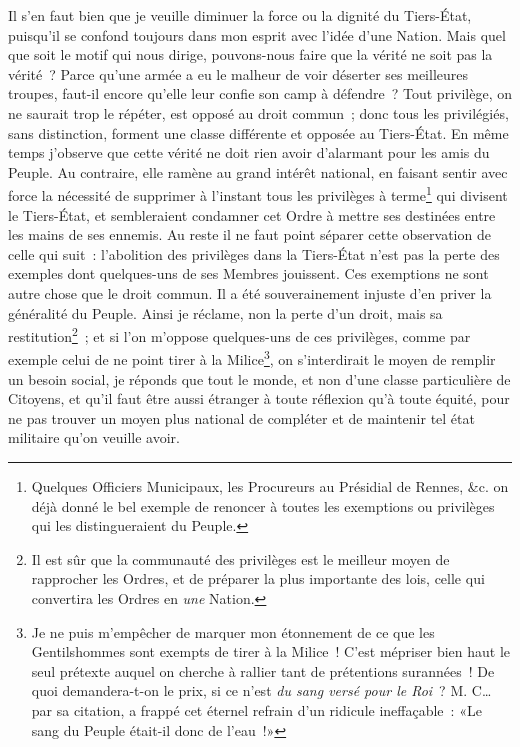 \documentclass[french,twoside]{book} %
\begin{document}
Il s’en faut bien que je veuille diminuer la force ou la dignité du Tiers-État, puisqu’il se confond toujours dans mon esprit avec l’idée d’une Nation. Mais quel que soit le motif qui nous dirige, pouvons-nous faire que la vérité ne soit pas la vérité ? Parce qu’une armée a eu le malheur de voir déserter ses meilleures troupes, faut-il encore qu’elle leur confie son camp à défendre ? Tout privilège, on ne saurait trop le répéter, est opposé au droit commun ; donc tous les privilégiés, sans distinction, forment une classe différente et opposée au Tiers-État. En même temps j’observe que cette vérité ne doit rien avoir d’alarmant pour les amis du Peuple. Au contraire, elle ramène au grand intérêt national, en faisant sentir avec force la nécessité de supprimer à l’instant tous les privilèges à terme\footnote{Quelques Officiers Municipaux, les Procureurs au Présidial de Rennes, \&c. on déjà donné le bel exemple de renoncer à toutes les exemptions ou privilèges qui les distingueraient du Peuple.} qui divisent le Tiers-État, et sembleraient condamner cet Ordre à mettre ses destinées entre les mains de ses ennemis. Au reste il ne faut point séparer cette observation de celle qui suit : l’abolition des privilèges dans la Tiers-État n’est pas la perte des exemples dont quelques-uns de ses Membres jouissent. Ces exemptions ne sont autre chose que le droit commun. Il a été souverainement injuste d’en priver la généralité du Peuple. Ainsi je réclame, non la perte d’un droit, mais sa restitution\footnote{Il est sûr que la communauté des privilèges est le meilleur moyen de rapprocher les Ordres, et de préparer la plus importante des lois, celle qui convertira les Ordres en {\itshape une} Nation.} ; et si l’on m’oppose quelques-uns de ces privilèges, comme par exemple celui de ne point tirer à la Milice\footnote{Je ne puis m’empêcher de marquer mon étonnement de ce que les Gentilshommes sont exempts de tirer à la Milice ! C’est mépriser bien haut le seul prétexte auquel on cherche à rallier tant de prétentions surannées ! De quoi demandera-t-on le prix, si ce n’est {\itshape du sang versé pour le Roi} ? M. C… par sa citation, a frappé cet éternel refrain d’un ridicule ineffaçable : «Le sang du Peuple était-il donc de l’eau !»}, on s’interdirait le moyen de remplir un besoin social, je réponds que tout le monde, et non d’une classe particulière de Citoyens, et qu’il faut être aussi étranger à toute réflexion qu’à toute équité, pour ne pas trouver un moyen plus national de compléter et de maintenir tel état militaire qu’on veuille avoir.\par
\end{document}

